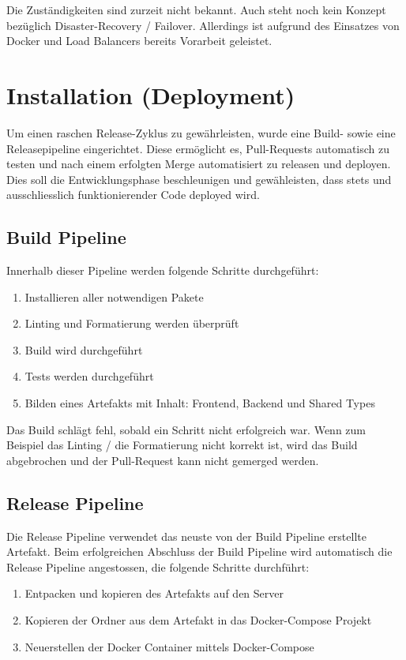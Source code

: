 \documentclass[11pt,a4paper,german]{scrartcl}
\let\oldsection\section
\renewcommand\section{\clearpage\oldsection}
\begin{document}
Die Zuständigkeiten sind zurzeit nicht bekannt. Auch steht noch kein Konzept bezüglich Disaster-Recovery / Failover. Allerdings ist aufgrund des Einsatzes von Docker und Load Balancers bereits Vorarbeit geleistet.


\section{Installation (Deployment)}

Um einen raschen Release-Zyklus zu gewährleisten, wurde eine Build- sowie eine Releasepipeline eingerichtet.
Diese ermöglicht es, Pull-Requests automatisch zu testen und nach einem erfolgten Merge automatisiert zu releasen und deployen.
Dies soll die Entwicklungsphase beschleunigen und gewähleisten, dass stets und ausschliesslich funktionierender Code deployed wird.

\subsection{Build Pipeline}
Innerhalb dieser Pipeline werden folgende Schritte durchgeführt:
\begin{enumerate}
  \item Installieren aller notwendigen Pakete
  \item Linting und Formatierung werden überprüft
  \item Build wird durchgeführt
  \item Tests werden durchgeführt
  \item Bilden eines Artefakts mit Inhalt: Frontend, Backend und Shared Types
\end{enumerate}
Das Build schlägt fehl, sobald ein Schritt nicht erfolgreich war. Wenn zum Beispiel das Linting / die Formatierung nicht korrekt ist, wird das Build abgebrochen und der Pull-Request kann nicht gemerged werden.

\subsection{Release Pipeline}
Die Release Pipeline verwendet das neuste von der Build Pipeline erstellte Artefakt. Beim erfolgreichen Abschluss der Build Pipeline wird automatisch die Release Pipeline angestossen, die folgende Schritte durchführt:
\begin{enumerate}
  \item Entpacken und kopieren des Artefakts auf den Server
  \item Kopieren der Ordner aus dem Artefakt in das Docker-Compose Projekt
  \item Neuerstellen der Docker Container mittels Docker-Compose
\end{enumerate}
\end{document}
